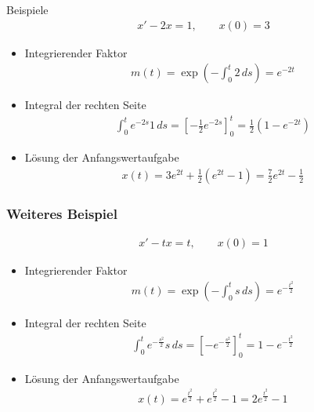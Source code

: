 \begin{frame}{Beispiele}
  \begin{gather*}
    x' - 2x = 1, \qquad x(0) = 3
  \end{gather*}
  \begin{itemize}
  \item Integrierender Faktor
    \begin{gather*}
      m(t) = \exp\left(-\int_0^t 2\,ds\right) = e^{-2t}
    \end{gather*}
  \item Integral der rechten Seite
    \begin{gather*}
      \int_{0}^t e^{-2s} 1 \,ds = \left[-\frac12 e^{-2s}\right]_0^t
      = \frac12\left(1-e^{-2t}\right)
    \end{gather*}
  \item Lösung der Anfangswertaufgabe
    \begin{gather*}
      x(t) = 3 e^{2t} + \frac12 \left(e^{2t}-1\right) = \frac72 e^{2t} - \frac12
    \end{gather*}
  \end{itemize}
\end{frame}

\begin{frame}
  \frametitle<presentation>{Weiteres Beispiel}
  \begin{gather*}
    x' - tx = t, \qquad x(0) = 1
  \end{gather*}
  \begin{itemize}
  \item Integrierender Faktor
    \begin{gather*}
      m(t) = \exp\left(-\int_0^t s\,ds\right) = e^{-\frac{t^2}{2}}
    \end{gather*}
  \item Integral der rechten Seite
    \begin{gather*}
      \int_{0}^t e^{-\frac{s^2}{2}} s \,ds = \left[-e^{-\frac{s^2}{2}}\right]_0^t
      = 1-e^{-\frac{t^2}{2}}
    \end{gather*}
  \item Lösung der Anfangswertaufgabe
    \begin{gather*}
      x(t) = e^{\frac{t^2}{2}} + e^{\frac{t^2}{2}} -1 = 2e^{\frac{t^2}{2}} -1
    \end{gather*}
  \end{itemize}  
\end{frame}

